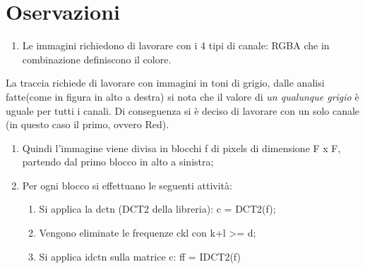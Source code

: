 \documentclass[12pt]{article}
\begin{document}
\section{Oservazioni}
	\begin{enumerate}
		\item Le immagini richiedono di lavorare con i 4 tipi di canale: RGBA che in combinazione definiscono il colore.
	\end{enumerate}
	La traccia richiede di lavorare con immagini in toni di grigio, dalle analisi fatte(come in figura in alto a destra) si nota che il valore di \textit{un qualunque grigio} è uguale per tutti i canali.\newline
Di conseguenza si è deciso di lavorare con un solo canale (in questo caso il primo, ovvero Red).
	\begin{enumerate}
		\item Quindi l’immagine viene divisa in blocchi f di pixels di dimensione F x F, partendo dal primo blocco in alto a sinistra;
		\item Per ogni blocco si effettuano le seguenti attività:
		\begin{enumerate}[label=\Alph*]
			\item Si applica la dctn (DCT2 della libreria): c = DCT2(f);
			\item Vengono eliminate le frequenze ckl con k+l >= d;
			\item Si applica idctn sulla matrice c: ff = IDCT2(f)
		\end{enumerate}
	\end{enumerate}
\end{document}
